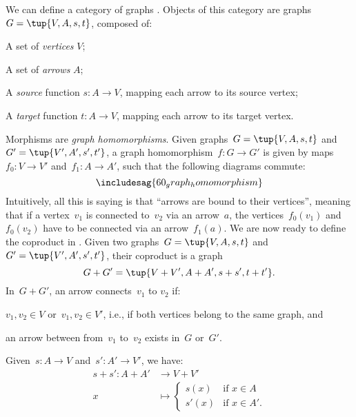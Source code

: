 \begin{example}
  We can define a category of graphs \iindex{\Graph}. Objects of this category are graphs~$G=\tup{V,A,s,t}$, composed of:
  \begin{compactitem}
    \item A set of \emph{vertices} $V$;
    \item A set of \emph{arrows} $A$;
    \item A \emph{source} function $s\colon A\to V$, mapping each arrow to its source vertex;
    \item A \emph{target} function $t\colon A\to V$, mapping each arrow to its target vertex.
  \end{compactitem}
  Morphisms are \emph{graph homomorphisms}. Given graphs~$G=\tup{V,A,s,t}$ and~$G'=\tup{V',A',s',t'}$, a graph homomorphism~$f\colon G\to G'$ is given by maps~$f_0\colon V\to V'$ and~$f_1\colon A\to A'$, such that the following diagrams commute:
  \begin{equation*}
    \includesag{60_graph_homomorphism}
  \end{equation*}
  Intuitively, all this is saying is that ``arrows are bound to their vertices'', meaning that if a vertex~$v_1$ is connected to~$v_2$ via an arrow~$a$, the vertices~$f_0(v_1)$ and~$f_0(v_2)$ have to be connected via an arrow~$f_1(a)$. We are now ready to define the coproduct in \Graph. Given two graphs~$G=\tup{V,A,s,t}$ and~$G'=\tup{V',A',s',t'}$, their coproduct is a graph
  \begin{equation*}
    G+G'=\tup{V+V',A+A',s+s',t+t'}.
  \end{equation*}
  In~$G+G'$, an arrow connects~$v_1$ to $v_2$ if:
  \begin{compactitem}
    \item $v_1,v_2\in V$ or~$v_1,v_2\in V'$, i.e., if both vertices belong to the same graph, and
    \item an arrow between from~$v_1$ to~$v_2$ exists in~$G$ or~$G'$.
  \end{compactitem}
  Given~$s\colon A\to V$ and~$s'\colon A'\to V'$, we have:
  \begin{equation*}
    \begin{aligned}
      s+ s'\colon A+ A'&\to V+ V'\\
      x&\mapsto
      \begin{cases}
        s(x)& \text{if } x\in A\\
        s'(x)&\text{if } x\in A'.
      \end{cases}

\end{aligned}
\end{equation*}
\end{example}
